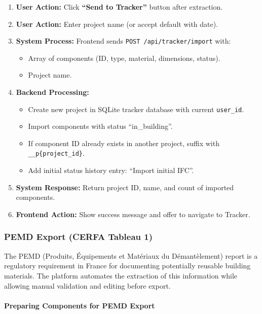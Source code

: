 \documentclass[11pt,a4paper]{article}
\begin{document}
\begin{enumerate}[leftmargin=*]
    \item \textbf{User Action:} Click \textbf{``Send to Tracker''} button after extraction.
    \item \textbf{User Action:} Enter project name (or accept default with date).
    \item \textbf{System Process:} Frontend sends \texttt{POST /api/tracker/import} with:
        \begin{itemize}
            \item Array of components (ID, type, material, dimensions, status).
            \item Project name.
        \end{itemize}
    \item \textbf{Backend Processing:}
        \begin{itemize}
            \item Create new project in SQLite tracker database with current \texttt{user\_id}.
            \item Import components with status ``in\_building''.
            \item If component ID already exists in another project, suffix with \texttt{\_\_p\{project\_id\}}.
            \item Add initial status history entry: ``Import initial IFC''.
        \end{itemize}
    \item \textbf{System Response:} Return project ID, name, and count of imported components.
    \item \textbf{Frontend Action:} Show success message and offer to navigate to Tracker.
\end{enumerate}

\subsubsection{PEMD Export (CERFA Tableau 1)}

The PEMD (Produits, Équipements et Matériaux du Démantèlement) report is a regulatory requirement in France for documenting potentially reusable building materials. The platform automates the extraction of this information while allowing manual validation and editing before export.

\paragraph{Preparing Components for PEMD Export}
\end{document}

